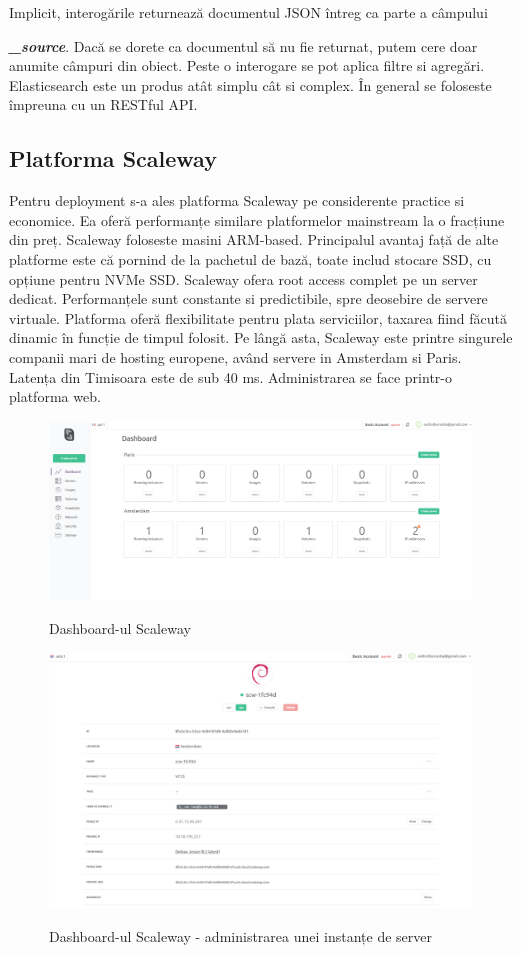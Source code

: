 \documentclass[a4paper, 12pt, twoside]{report}
\begin{document}
Implicit, interogările returnează documentul JSON întreg ca parte a câmpului {\textbf{\textit{\_source}}. Dacă se dorete ca documentul să nu fie returnat, putem cere doar anumite câmpuri din obiect. Peste o interogare se pot aplica filtre si agregări. Elasticsearch este un produs atât simplu cât si complex. În general se foloseste împreuna cu un RESTful API.

	\subsection{Platforma Scaleway}
Pentru deployment s-a ales platforma Scaleway pe considerente practice si economice. Ea oferă performanțe similare platformelor mainstream la o fracțiune din preț. Scaleway foloseste masini ARM-based. Principalul avantaj față de alte platforme este că pornind de la pachetul de bază, toate includ stocare SSD, cu opțiune pentru NVMe SSD. Scaleway ofera root access complet pe un server dedicat. Performanțele sunt constante si predictibile, spre deosebire de servere virtuale. Platforma oferă flexibilitate pentru plata serviciilor, taxarea fiind făcută dinamic în funcție de timpul folosit. Pe lângă asta, Scaleway este printre singurele companii mari de hosting europene, având servere in Amsterdam si Paris. Latența din Timisoara este de sub 40 ms. Administrarea se face printr-o platforma web.
\begin{figure}[h]
	\centering
		{\includegraphics[width=170mm]{scaleway1.png}}
	\caption{Dashboard-ul Scaleway}
\end{figure}
\begin{figure}[h]
	\centering
		{\includegraphics[width=170mm]{scaleway2.png}}
	\caption{Dashboard-ul Scaleway - administrarea unei instanțe de server}
\end{figure}

}
\end{document}
